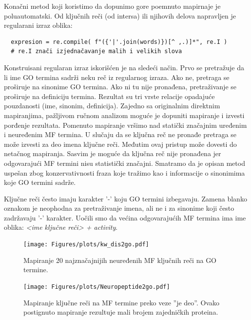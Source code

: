 Konačni metod koji koristimo da dopunimo gore poemnuto mapirnaje je
poluautomatski. Od ključnih reči (od intersa) ili njihovih delova napravljen je
regularani izraz oblika:
\begin{verbatim}
  expresion = re.compile( f"({'|'.join(words)})[^ ,.)]*", re.I )
  # re.I znači izjednačavanje malih i velikih slova
\end{verbatim}
Konstruisani regularan izraz iskorišćen je na sledeći način. Prvo se pretražuje
da li ime GO termina sadrži neku reč iz regularnog izraza. Ako ne, pretraga se
proširuje na  sinonime GO termina. Ako ni tu nije pronađena, pretraživanje se
proširuje na definiciju termina. Rezultat su tri vrste relacije opadajuće
pouzdanosti (ime, sinonim, definicija). Zajedno sa originalnim direktnim
mapiranjima, pažljivom ručnom analizom moguće je dopuniti mapiranje i izvesti
porđenje rezultata.  Pomenuto mapiranje vršimo nad statički značajnim uređenim
i neuređenim MF termina.  U slučaju da se ključna reč ne pronađe pretraga se
može izvesti za deo imena ključne reči. Međutim ovaj pristup može dovesti do
netačnog mapiranja. Sasvim je moguće da ključna reč nije pronađena jer
odgovarajući MF termini nisu statistički značajni.  Smatramo da je opisan metod
uspešan zbog konzervativnosti fraza koje tražimo kao i informacije o sinonimima
koje GO termini sadrže.

Ključne reči često imaju karakter '-' koju GO termini izbegavaju. Zamena blanko
oznakom je neophodna za pretraživanje imena, ali ne i za sinonime koji često
zadržavaju '-' karakter.  Uočili smo da većina odgovarajućih MF termina ima ime
oblika: \textit{<ime ključne reči> + activity}.



\begin{figure}[th]
\hspace*{-2.2cm} 
\texttt{[image: Figures/plots/kw\_dis2go.pdf]}
\decoRule
\caption {
  Mapiranje 20 najznačajnijih neuređenih MF ključnih reči \parencite{Xie2007} 
  na GO termine.
}
\label{fig:KWtop20dis}
\end{figure}

\begin{figure}[th]
\centering
\hspace*{-1.0cm} 
\texttt{[image: Figures/plots/Neuropeptide2go.pdf]}
\decoRule
\caption {
  Mapiranje ključne reči  na MF termine preko veze ''je deo''.
  Ovako postignuto mapiranje rezultuje mali brojem zajedničkih proteina.
}
\label{fig:neuropeptide}
\end{figure}
